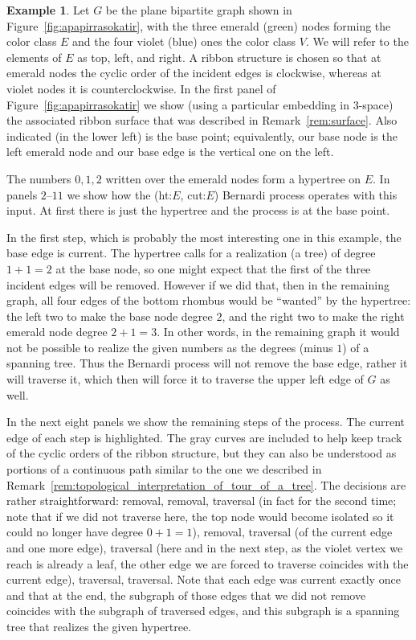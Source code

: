 \documentclass[10pt]{amsart}
\theoremstyle{definition}\newtheorem{defi}[theo]{Definition}
\newtheorem{exam}[theo]{Example}
\theoremstyle{remark}\newtheorem{rema}[theo]{Remark}
\begin{document}
\begin{exam}
\label{ex:apapirrasokatir}
Let $G$ be the plane bipartite graph shown in Figure~\ref{fig:apapirrasokatir}, with the three emerald (green) nodes forming the color class $E$ and the four violet (blue) ones the color class $V$. We will refer to the elements of $E$ as top, left, and right. A ribbon structure is chosen so that at emerald nodes the cyclic order of the incident edges is clockwise, whereas at violet nodes it is counterclockwise. In the first panel of Figure~\ref{fig:apapirrasokatir} we show (using a particular embedding in $3$-space) the associated ribbon surface that was described in Remark~\ref{rem:surface}. Also indicated (in the lower left) is the base point; equivalently, our base node is the left emerald node and our base edge is the vertical one on the left.

The numbers $0,1,2$ written over the emerald nodes form a hypertree on $E$. In panels $2$--$11$ we show how the (ht:$E$, cut:$E$) Bernardi process operates with this input. At first there is just the hypertree and the process is at the base point. 

In the first step, which is probably the most interesting one in this example, the base edge is current. The hypertree calls for a realization (a tree) of degree $1+1=2$ at the base node, so one might expect that the first of the three incident edges will be removed. However if we did that, then in the remaining graph, all four edges of the bottom rhombus would be ``wanted'' by the hypertree: the left two to make the base node degree $2$, and the right two to make the right emerald node degree $2+1=3$. In other words, in the remaining graph it would not be possible to realize the given numbers as the degrees (minus $1$) of a spanning tree. Thus the Bernardi process will not remove the base edge, rather it will traverse it, which then will force it to traverse the upper left edge of $G$ as well.

In the next eight panels we show the remaining steps of the process. The current edge of each step is highlighted. The gray curves are included to help keep track of the cyclic orders of the ribbon structure, but they can also be understood as portions of a continuous path similar to the one we described in Remark~\ref{rem:topological_interpretation_of_tour_of_a_tree}. The decisions are rather straightforward: removal, removal, traversal (in fact for the second time; note that if we did not traverse here, the top node would become isolated so it could no longer have degree $0+1=1$), removal, traversal (of the current edge and one more edge), traversal (here and in the next step, as the violet vertex we reach is already a leaf, the other edge we are forced to traverse coincides with the current edge), traversal, traversal. Note that each edge was current exactly once and that at the end, the subgraph of those edges that we did not remove coincides with the subgraph of traversed edges, and this subgraph is a spanning tree that realizes the given hypertree.


\end{exam}
\end{document}
